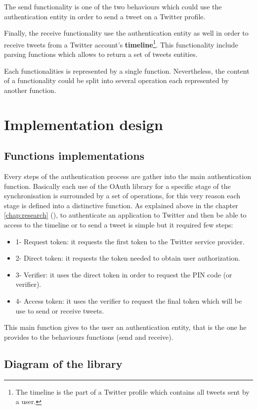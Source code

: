 The send functionality is one of the two behaviours which could use the authentication entity in order to send a tweet on a Twitter profile.

Finally, the receive functionality use the authentication entity as well in order to receive tweets from a Twitter account's \textbf{timeline}\footnote{The timeline is the part of a Twitter profile which contains all tweets sent by a user.}. This functionality include parsing functions which allows to return a set of tweets entities. 

Each functionalities is represented by a single function. Nevertheless, the content of a functionality could be split into several operation each represented by another function.



\section{Implementation design}


\subsection{Functions implementations}


\hspace{15mm}Every steps of the authentication process are gather into the main authentication function. Basically each use of the OAuth library for a specific stage of the synchronisation is surrounded by a set of operations, for this very reason each stage is defined into a distinctive function. As explained above in the chapter \ref{chap:research} (), to authenticate an application to Twitter and then be able to access to the timeline or to send a tweet is simple but it required few steps:
\begin{itemize}
\item 1- Request token: it requests the first token to the Twitter service provider.
\item 2- Direct token: it requests the token needed to obtain user authorization.
\item 3- Verifier: it uses the direct token in order to request the PIN code (or verifier). 
\item 4- Access token: it uses the verifier to request the final token which will be use to send or receive tweets.
\end{itemize}
This main function gives to the user an authentication entity, that is the one he provides to the behaviours functions (send and receive).






\subsection{Diagram of the library}




\clearpage
